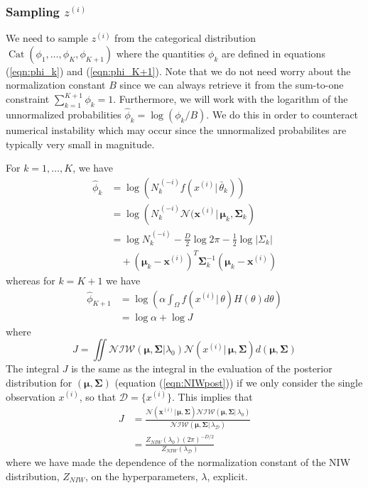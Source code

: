 \documentclass[final,3p,times,twocolumn]{elsarticle}
\DeclareMathOperator*{\Cat}{Cat}
\let\bs\boldsymbol
\begin{document}
\subsubsection{Sampling $z^{(i)}$}
We need to sample $z^{(i)}$ from the categorical distribution $\Cat(\phi_1,\dots,\phi_K,\phi_{K+1})$ where the quantities $\phi_k$ are defined in equations (\ref{eqn:phi_k}) and (\ref{eqn:phi_K+1}).
Note that we do not need worry about the normalization constant $B$ since we can always retrieve it from the sum-to-one constraint $\sum_{k=1}^{K+1}\phi_k=1$.
Furthermore, we will work with the logarithm of the unnormalized probabilities $\hat\phi_k = \log(\phi_k/B)$.
We do this in order to counteract numerical instability which may occur since the unnormalized probabilites are typically very small in magnitude. 

For $k=1,\dots,K$, we have
\begin{equation}
\begin{split}
\hat\phi_k &= \log\left(N^{\,(-i)}_k f(x^{(i)}|\,\bar\theta_k)\right)\\
&= \log\left(N^{\,(-i)}_k \mathcal{N}(\bs x^{(i)}|\,\bs\mu_k,\bs\Sigma_k\right)\\
&= \log N^{\,(-i)}_k -\frac{D}{2}\log2\pi -\frac{1}{2}\log|\Sigma_k|\\
&\quad+ (\bs\mu_k-\bs x^{(i)})^T\bs\Sigma_k^{-1}(\bs\mu_k-\bs x^{(i)})
\end{split}
\end{equation}
whereas for $k=K+1$ we have
\begin{equation}
\begin{split}
\hat\phi_{K+1} &= \log\left(\alpha\int_\Omega f(x^{(i)}|\,\theta)H(\theta)d\theta\right)\\
&=\log\alpha+\log J
\end{split}
\end{equation}
where
\begin{equation}
J = \iint\mathcal{NIW}(\bs\mu,\bs\Sigma|\lambda_0)\mathcal{N}(x^{(i)}|\,\bs\mu,\bs\Sigma)d(\bs\mu,\bs\Sigma)
\end{equation}
The integral $J$ is the same as the integral in the evaluation of the posterior distribution for $(\bs\mu,\bs\Sigma)$ (equation (\ref{eqn:NIWpost})) if we only consider the single observation $x^{(i)}$, so that $\mathcal{D}=\{x^{(i)}\}$.
This implies that
\begin{equation}
\begin{split}
J &= \frac{\mathcal{N}(\bs x^{(i)}|\,\bs\mu,\bs\Sigma)\mathcal{NIW}(\bs\mu,\bs\Sigma|\,\lambda_0)}{\mathcal{NIW}(\bs\mu,\bs\Sigma|\,\lambda_\mathcal{D})}\\
&= \frac{Z_{NIW}(\lambda_0) (2\pi)^{-D/2}}{Z_{NIW}(\lambda_\mathcal{D})}
\end{split}
\end{equation}
where we have made the dependence of the normalization constant of the NIW distribution, $Z_{NIW}$, on the hyperparameters, $\lambda$, explicit.
\end{document}
